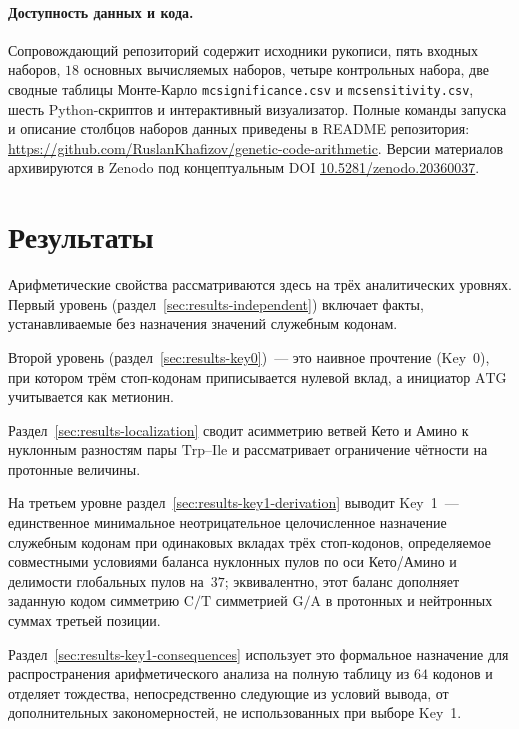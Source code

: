 \documentclass[11pt,a4paper]{article}
\renewcommand{\_}{\origunderscore\allowbreak}
\begin{document}
\paragraph{Доступность данных и кода.}
Сопровождающий репозиторий содержит исходники рукописи, пять входных
наборов, $18$ основных вычисляемых наборов, четыре контрольных
набора, две сводные таблицы Монте-Карло
\texttt{mc\_significance.csv} и \texttt{mc\_sensitivity.csv},
шесть Python-скриптов и интерактивный
визуализатор. Полные команды запуска и описание столбцов наборов данных
приведены в README репозитория:
\url{https://github.com/RuslanKhafizov/genetic-code-arithmetic}.
Версии материалов архивируются в Zenodo под концептуальным DOI
\href{https://doi.org/10.5281/zenodo.20360037}
     {10.5281/zenodo.20360037}.

\endgroup

\section{Результаты}
\label{sec:results}

Арифметические свойства рассматриваются здесь на трёх аналитических
уровнях. Первый уровень (раздел~\ref{sec:results-independent}) включает
факты, устанавливаемые без назначения значений служебным кодонам.

Второй уровень (раздел~\ref{sec:results-key0})~--- это наивное
прочтение (Key~0), при котором трём стоп-кодонам приписывается нулевой
вклад, а инициатор $\mathrm{ATG}$ учитывается как метионин.

Раздел~\ref{sec:results-localization} сводит асимметрию ветвей Кето и
Амино к нуклонным разностям пары $\mathrm{Trp}$--$\mathrm{Ile}$ и
рассматривает ограничение чётности на протонные величины.

На третьем уровне раздел~\ref{sec:results-key1-derivation}
выводит Key~1~--- единственное минимальное неотрицательное
целочисленное назначение служебным кодонам при одинаковых вкладах
трёх стоп-кодонов, определяемое совместными
условиями баланса нуклонных пулов по оси Кето/Амино и делимости
глобальных пулов на~$37$; эквивалентно, этот баланс дополняет заданную
кодом симметрию $\mathrm{C}/\mathrm{T}$ симметрией
$\mathrm{G}/\mathrm{A}$ в протонных и нейтронных суммах третьей
позиции.

Раздел~\ref{sec:results-key1-consequences} использует это формальное
назначение для распространения арифметического анализа на полную
таблицу из $64$ кодонов и отделяет тождества, непосредственно следующие
из условий вывода, от дополнительных закономерностей, не
использованных при выборе Key~1.
\end{document}
